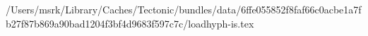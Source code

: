 /Users/msrk/Library/Caches/Tectonic/bundles/data/6ffe055852f8faf66c0acbe1a7fb27f87b869a90bad1204f3bf4d9683f597c7c/loadhyph-is.tex